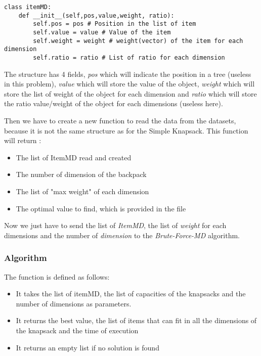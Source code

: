 \documentclass[12pt]{article}
\begin{document}
            \bigskip
            \begin{lstlisting}
class itemMD:
    def __init__(self,pos,value,weight, ratio):
        self.pos = pos # Position in the list of item
        self.value = value # Value of the item
        self.weight = weight # weight(vector) of the item for each dimension
        self.ratio = ratio # List of ratio for each dimension
            \end{lstlisting}
            \bigskip

            The structure has 4 fields, \emph{pos} which will indicate the position in a tree (useless in this problem), \emph{value} which will store the value of the object, \emph{weight} which will store the list of weight of the object for each dimension and \emph{ratio} which will store the ratio value/weight of the object for each dimensions (useless here).\newline

            Then we have to create a new function to read the data from the datasets, because it is not the same structure as for the Simple Knapsack. This function will return :

            \begin{itemize}
                \item The list of ItemMD read and created
                \item The number of dimension of the backpack
                \item The list of "max weight" of each dimension
                \item The optimal value to find, which is provided in the file
            \end{itemize}

            Now we just have to send the list of \emph{ItemMD}, the list of \emph{weight} for each dimensions and the number of \emph{dimension} to the \emph{Brute-Force-MD} algorithm.
            
        \newpage
        \subsubsection{Algorithm}

            The function is defined as follows:
                \begin{itemize}
                    \item It takes the list of itemMD, the list of capacities of the knapsacks and the number of dimensions as parameters.
                    \item It returns the best value, the list of items that can fit in all the dimensions of the knapsack and the time of execution
                    \item It returns an empty list if no solution is found
                \end{itemize}
\end{document}
